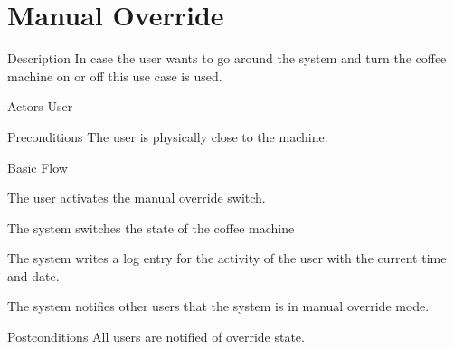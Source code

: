 \section{Manual Override}


%
\begin{cpart}{Description}
In case the user wants to go around the system and turn the coffee machine on or off this use case is used.
\end{cpart}


%
\begin{cpart}{Actors}
User
\end{cpart}

%
\begin{cpart}{Preconditions}
The user is physically close to the machine.
\end{cpart}

%
\begin{cpartList}{Basic Flow}
  \item The user activates the manual override switch.
  \item The system switches the state of the coffee machine
\item The system writes a log entry for the activity of the user with the current time and date.
  \item The system notifies other users that the system is in manual override mode.
\end{cpartList}

%
\begin{cpart}{Postconditions}
  All users are notified of override state.
\end{cpart}

